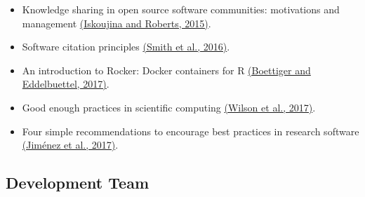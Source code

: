 \documentclass[]{book}
\begin{document}
\begin{itemize}
\item
  Knowledge sharing in open source software communities: motivations and management \href{https://github.com/OpenScienceMOOC/Module-5-Open-Research-Software-and-Open-Source/blob/master/Reading\%20Material_Open\%20Source\%20and\%20Open\%20Research\%20Software/Iskoujina\%20and\%20Roberts\%2C\%202015.pdf}{(Iskoujina and Roberts, 2015)}.
\item
  Software citation principles \href{https://github.com/OpenScienceMOOC/Module-5-Open-Research-Software-and-Open-Source/blob/master/Reading\%20Material_Open\%20Source\%20and\%20Open\%20Research\%20Software/Smith\%20et\%20al.\%2C\%202016.pdf}{(Smith et al., 2016)}.
\item
  An introduction to Rocker: Docker containers for R \href{https://github.com/OpenScienceMOOC/Module-5-Open-Research-Software-and-Open-Source/blob/master/Reading\%20Material_Open\%20Source\%20and\%20Open\%20Research\%20Software/Boettiger\%20and\%20Eddelbuettel\%2C\%202017.pdf}{(Boettiger and Eddelbuettel, 2017)}.
\item
  Good enough practices in scientific computing \href{https://github.com/OpenScienceMOOC/Module-5-Open-Research-Software-and-Open-Source/blob/master/Reading\%20Material_Open\%20Source\%20and\%20Open\%20Research\%20Software/Wilson\%20et\%20al.\%2C\%202017.pdf}{(Wilson et al., 2017)}.
\item
  Four simple recommendations to encourage best practices in research software \href{https://github.com/OpenScienceMOOC/Module-5-Open-Research-Software-and-Open-Source/blob/master/Reading\%20Material_Open\%20Source\%20and\%20Open\%20Research\%20Software/Jim\%C3\%A9nez\%20et\%20al.\%2C\%202018.pdf}{(Jiménez et al., 2017)}.
\end{itemize}

\hypertarget{development-team-1}{%
\subsection{Development Team }\label{development-team-1}}
\end{document}
